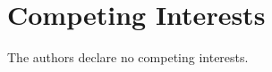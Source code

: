 \documentclass[pdflatex, sn-nature]{sn-jnl}%
\theoremstyle{thmstyleone}%
\theoremstyle{thmstyletwo}%
\theoremstyle{thmstylethree}%
\begin{document}

\section*{Competing Interests}
The authors declare no competing interests.


\end{document}
